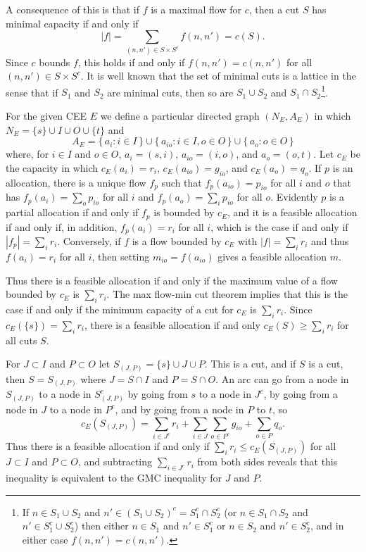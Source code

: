 \documentclass[12pt, A4paper]{article}
\theoremstyle{definition}
\begin{document}
A consequence of this is that if $f$ is a maximal flow for $c$, then a cut $S$ has minimal capacity if and only if $$|f| = \sum_{(n,n') \in S \times S^c} f(n,n') = c(S).$$  Since $c$ bounds $f$, this holds if and only if $f(n,n') = c(n,n')$ for all $(n,n') \in S \times S^c$.  
It is well known \citep{FoFu56,Sha61,Ore62} that the set of minimal cuts is a lattice in the sense that if $S_1$ and $S_2$ are minimal cuts, then so are $S_1 \cup S_2$ and $S_1 \cap S_2$\footnote{If $n \in S_1 \cup S_2$ and $n' \in (S_1 \cup S_2)^c = S_1^c \cap S_2^c$ 
(or $n \in S_1 \cap S_2$ and $n' \in S_1^c \cup S_2^c$) 
then either $n \in S_1$ and $n' \in S_1^c$ or $n \in S_2$ and $n' \in S_2^c$, and in either case $f(n,n') = c(n,n')$.}.

For the given CEE $E$ we define a particular directed graph $(N_E,A_E)$ in which
$N_E = \{s\} \cup I \cup  O \cup \{t\}$ and
$$A_E = \{\, a_i : i \in I \,\} \cup \{\, a_{io} : i \in I, o \in O \,\} \cup \{\, a_o : o \in O \,\}$$
where, for $i \in I$ and $o \in O$, $a_i = (s,i)$, $a_{io} = (i,o)$, and $a_o = (o,t)$.
Let $c_E$ be the capacity in which 
$c_E(a_i) = r_i$, $c_E(a_{io}) = g_{io}$, and $c_E(a_o) = q_o$.  
If $p$ is an allocation, there is a unique flow $f_p$ such that $f_p(a_{io}) = p_{io}$ for all $i$ and $o$ that has $f_p(a_i) = \sum_o p_{io}$ for all $i$ and $f_p(a_o) = \sum_i p_{io}$ for all $o$. Evidently $p$ is a partial allocation if and only if $f_p$ is bounded by $c_E$, and it is a feasible allocation if and only if, in addition, $f_p(a_i) = r_i$ for all $i$, which is the case if and only if $|f_p| = \sum_i r_i$.  Conversely, if $f$ is a flow bounded by $c_E$ with $|f| = \sum_i r_i$ and thus $f(a_i) = r_i$ for all $i$, then setting $m_{io} = f(a_{io})$ gives a feasible allocation $m$.

Thus there is a feasible allocation if and only if the maximum value of a flow bounded by $c_E$ is $\sum_i r_i$.  
The max flow-min cut theorem implies that this is the case if and only if the minimum capacity of a cut for $c_E$ is $\sum_i r_i$.  
Since $c_E(\{s\}) = \sum_i r_i$, there is a feasible allocation if and only $c_E(S) \ge \sum_i r_i$ for all cuts $S$.  

For $J \subset I$ and $P \subset O$ let $S_{(J,P)} = \{s\} \cup J \cup P$.  This is a cut, and if $S$ is a cut, then $S = S_{(J,P)}$ where  $J = S \cap I$ and $P = S \cap O$.  An arc can go from a node in $S_{(J,P)}$ to a node in $S_{(J,P)}^c$ by going from $s$ to a node in $J^c$, by going from a node in $J$ to a node in $P^c$, and by going from a node in $P$ to $t$, so
$$c_E(S_{(J,P)}) = \sum_{i \in J^c} r_i + \sum_{i \in J} \sum_{o \in P^c} g_{io} + \sum_{o \in P} q_o.$$
Thus there is a feasible allocation if and only if $\sum_i r_i \le c_E(S_{(J,P)})$ for all $J \subset I$ and $P \subset O$, and subtracting $\sum_{i \in J^c} r_i$ from both sides reveals that this inequality is equivalent to the GMC inequality for $J$ and $P$.
\end{document}
